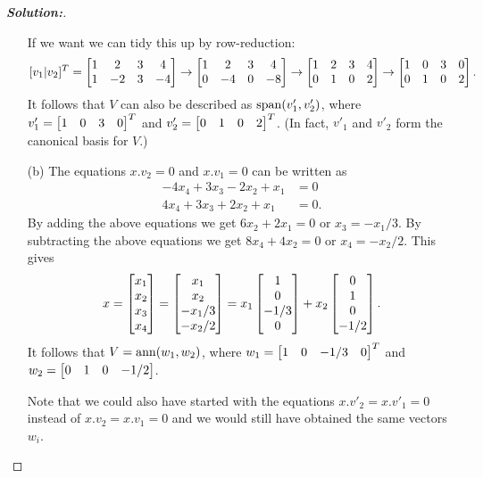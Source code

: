 \documentclass[a4paper]{amsart}
\theoremstyle{definition}
\newenvironment{solution}{\begin{proof}[\textbf{Solution:}] \vphantom{u}}{\end{proof}}
\begin{document}
\begin{solution}
\begin{itemize}
   If we want we can tidy this up by row-reduction:
   \[ [v_1|v_2]^T = 
      \left[\begin{matrix} 1 & 2 & 3 & 4 \\ 1 & -2 & 3 & -4 \end{matrix}\right] \to
      \left[\begin{matrix} 1 & 2 & 3 & 4 \\ 0 & -4 & 0 & -8 \end{matrix}\right] \to
      \left[\begin{matrix} 1 & 2 & 3 & 4 \\ 0 &  1 & 0 &  2 \end{matrix}\right] \to
      \left[\begin{matrix} 1 & 0 & 3 & 0 \\ 0 &  1 & 0 &  2 \end{matrix}\right].
   \]
   It follows that $V$ can also be described as $\operatorname{span}(v'_1,v'_2)$,
   where $v'_1=\left[\begin{matrix} 1&0&3&0\end{matrix}\right]^T$ and $v'_2=\left[\begin{matrix} 0&1&0&2\end{matrix}\right]^T$.
   (In fact, $v'_1$ and $v'_2$ form the canonical basis for $V$.)
  \item[(b)] The equations $x.v_2=0$ and $x.v_1=0$ can be written as 
   \begin{align*}
    -4x_4+3x_3-2x_2+x_1 &= 0 \\
     4x_4+3x_3+2x_2+x_1 &= 0.
   \end{align*}
   By adding the above equations we get $6x_2+2x_1=0$ or
   $x_3=-x_1/3$.  By subtracting the above equations we get
   $8x_4+4x_2=0$ or $x_4=-x_2/2$.  This gives
   \[ x = \left[\begin{matrix} x_1\\x_2\\x_3\\x_4\end{matrix}\right] 
        = \left[\begin{matrix} x_1\\x_2\\-x_1/3\\-x_2/2\end{matrix}\right] 
        = x_1 \left[\begin{matrix} 1\\0\\-1/3\\0\end{matrix}\right] + 
          x_2 \left[\begin{matrix} 0\\1\\0\\-1/2\end{matrix}\right].
   \]
   It follows that $V=\operatorname{ann}(w_1,w_2)$, where
   $w_1=\left[\begin{matrix} 1&0&-1/3&0\end{matrix}\right]^T$ and $w_2=\left[\begin{matrix} 0&1&0&-1/2\end{matrix}\right]$.

   Note that we could also have started with the equations
   $x.v'_2=x.v'_1=0$ instead of $x.v_2=x.v_1=0$ and we would still
   have obtained the same vectors $w_i$.
 \end{itemize}
\end{solution}
\end{document}
